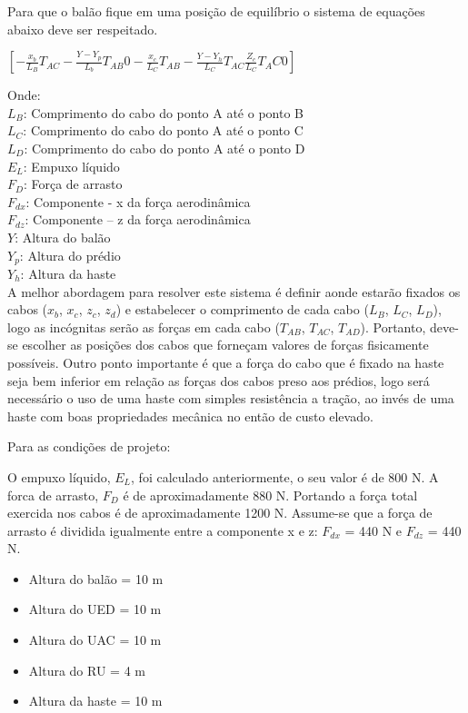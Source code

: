	Para que o balão fique em uma posição de equilíbrio o sistema de equações abaixo deve ser respeitado.

	$\left [ - \frac{x_{b}}{L_{B}}T_{AC} - \frac{Y-Y_{p}}{L_{b}}T_{AB}0 - \frac{x_{c}}{L_{C}}T_{AB} - \frac{Y-Y_{h}}{L_{C}}T_{AC} \frac{Z_{c}}{L_{C}}T_AC0 \right ]$

	Onde:\\
$L_{B}$: Comprimento do cabo do ponto A até o ponto B\\
$L_{C}$: Comprimento do cabo do ponto A até o ponto C\\
$L_{D}$: Comprimento do cabo do ponto A até o ponto D\\
$E_{L}$: Empuxo líquido\\
$F_{D}$: Força de arrasto\\
$F_{dx}$: Componente - x da força aerodinâmica\\
$F_{dz}$: Componente – z da força aerodinâmica\\
$Y$: Altura do balão\\
$Y_{p}$: Altura do prédio\\
$Y_{h}$: Altura da haste\\

A melhor abordagem para resolver este sistema é definir aonde estarão fixados os cabos ($x_{b}$, $x_{c}$, $z_{c}$, $z_{d}$) e estabelecer o comprimento de cada cabo ($L_{B}$, $L_{C}$, $L_{D}$), logo as incógnitas serão as forças em cada cabo ($T_{AB}$, $T_{AC}$, $T_{AD}$). Portanto, deve-se escolher as posições dos cabos que forneçam valores de forças fisicamente possíveis. Outro ponto importante é que a força do cabo que é fixado na haste seja bem inferior em relação as forças dos cabos preso aos prédios, logo será necessário o uso de uma haste com simples resistência a tração, ao invés de uma haste com boas propriedades mecânica no então de custo elevado.

	Para as condições de projeto:

	O empuxo líquido, $E_{L}$, foi calculado anteriormente, o seu valor é de 800 N. A forca de arrasto, $F_{D}$ é de aproximadamente 880 N. Portando a força total exercida nos cabos é de aproximadamente 1200 N. Assume-se que a força de arrasto é dividida igualmente entre a componente x e z: $F_{dx}$ = 440 N e $F_{dz}$ = 440 N.

	\begin{itemize}
		\item  Altura do balão = 10 m
 		\item Altura do UED = 10 m
 		\item Altura do UAC = 10 m
 		\item Altura do RU = 4 m
 		\item Altura da haste = 10 m
	\end{itemize}

